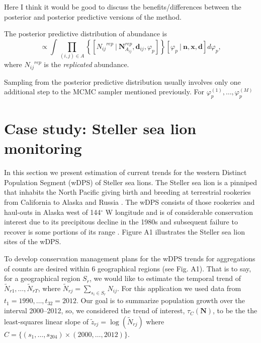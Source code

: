 \documentclass[12pt,letter,draft]{article}
\newcommand{\Nij}{\ensuremath{N_{ij}}}
\newcommand{\dij}{\ensuremath{\mathbf{d}_{ij}}}
\begin{document}
Here I think it would be good to discuss the benefits/differences between the posterior and posterior predictive versions of the method.

The posterior predictive distribution of abundance is
\begin{equation}
[\mathbf{N}^{rep}|\mathbf{n}] \propto \int \prod_{(i,j)\in A}\left\{[\Nij^{rep}\ |\ \mathbf{N}_{A_{ij}}^{rep}, \dij, \varphi_p]\right\}[\varphi_p\ |\ \mathbf{n}, \mathbf{x}, \mathbf{d}]d\varphi_p,\end{equation} 
where $\Nij^{rep}$ is the {\em replicated} abundance. 

Sampling from the posterior predictive distribution usually involves only one additional step to the MCMC sampler mentioned previously. For  $\varphi_p^{(1)},\dots,\varphi_p^{(M)}$ 


\section{Case study: Steller sea lion monitoring}

In this section we present estimation of current trends for the western Distinct Population Segment (wDPS) of Steller sea lions. The Steller sea lion is a pinniped that inhabits the North Pacific giving birth and breeding at terrestrial rookeries from California to Alaska and Russia \citep{}. The wDPS consists of those rookeries and haul-outs in Alaska west of 144$^\circ$ W longitude and is of considerable conservation interest due to its precipitous decline in the 1980s and subsequent failure to recover is some portions of its range \citep{}. Figure A1 illustrates the Steller sea lion sites of the wDPS.

To develop conservation management plans for the wDPS trends for aggregations of counts are desired within 6 geographical regions \citep{}(see Fig. A1). That is to say, for a geographical region $S_r$, we would like to estimate the temporal trend of $\tilde N_{r1},\dots,\tilde N_{rT}$, where $\tilde N_{rj} = \sum_{s_i \in S_r} N_{ij}$. For this application we used data from $t_1=1990,\dots,t_{32}=2012$. Our goal is to summarize population growth over the interval 2000--2012, so, we considered the trend of interest, $\tau_C(\mathbf{N})$, to be the the least-squares linear slope of $\tilde z_{rj} = \log(\tilde N_{rj})$ where $C=\{(s_1,\dots,s_{204}) \times (2000,\dots,2012)\}$. 
\end{document}
